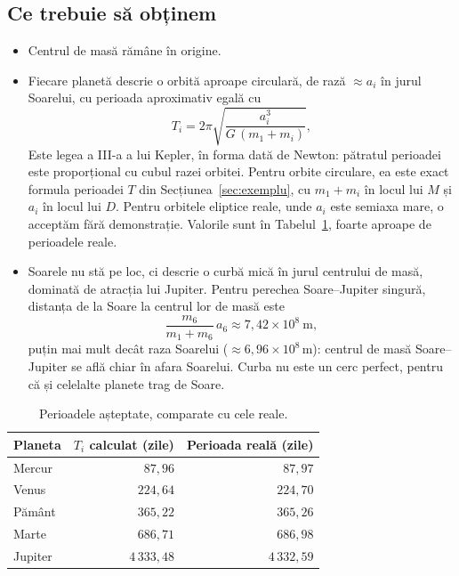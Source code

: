 \documentclass[11pt,a4paper]{article}
\begin{document}
\subsection*{Ce trebuie să obținem}
\begin{itemize}
  \item Centrul de masă rămâne în origine.
  \item Fiecare planetă descrie o orbită aproape circulară, de rază $\approx a_i$ în jurul Soarelui, cu perioada aproximativ egală cu
  \[
    T_i = 2\pi\sqrt{\frac{a_i^3}{G\,(m_1 + m_i)}},
  \]
  Este legea a III-a a lui Kepler, în forma dată de Newton: pătratul perioadei este proporțional cu cubul razei orbitei. Pentru orbite circulare, ea este exact formula perioadei $T$ din Secțiunea~\ref{sec:exemplu}, cu $m_1 + m_i$ în locul lui $M$ și $a_i$ în locul lui $D$. Pentru orbitele eliptice reale, unde $a_i$ este semiaxa mare, o acceptăm fără demonstrație. Valorile sunt în Tabelul~\ref{tab:perioade}, foarte aproape de perioadele reale.
  \item Soarele nu stă pe loc, ci descrie o curbă mică în jurul centrului de masă, dominată de atracția lui Jupiter. Pentru perechea Soare--Jupiter singură, distanța de la Soare la centrul lor de masă este
  \[
    \frac{m_6}{m_1 + m_6}\,a_6 \approx 7{,}42\times10^{8}\ \text{m},
  \]
  puțin mai mult decât raza Soarelui ($\approx 6{,}96\times10^{8}$\,m): centrul de masă Soare--Jupiter se află chiar în afara Soarelui. Curba nu este un cerc perfect, pentru că și celelalte planete trag de Soare.
\end{itemize}

\begin{table}[H]
\centering
\begin{tabular}{@{}lrr@{}}
\toprule
Planeta & $T_i$ calculat (zile) & Perioada reală (zile) \\
\midrule
Mercur  & $87{,}96$   & $87{,}97$   \\
Venus   & $224{,}64$  & $224{,}70$  \\
Pământ  & $365{,}22$  & $365{,}26$  \\
Marte   & $686{,}71$  & $686{,}98$  \\
Jupiter & $4\,333{,}48$ & $4\,332{,}59$ \\
\bottomrule
\end{tabular}
\caption{Perioadele așteptate, comparate cu cele reale.}
\label{tab:perioade}
\end{table}
\end{document}
